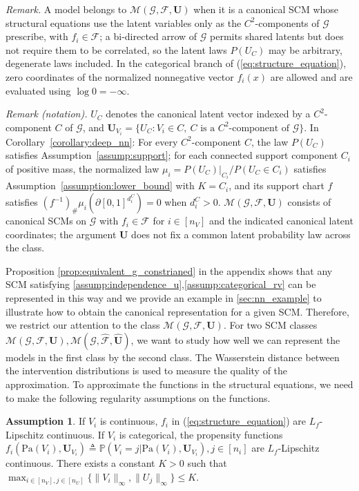 \documentclass[12pt]{article}
\theoremstyle{plain}
\theoremstyle{definition}
\newtheorem{assumption}[theorem]{Assumption}
\theoremstyle{remark}
\begin{document}
\noindent\textit{Remark.} A model belongs to $\mathcal M(\mathcal G,\mathcal F,\boldsymbol U)$ when it is a canonical SCM whose structural equations use the latent variables only as the $C^2$-components of $\mathcal G$ prescribe, with $f_i\in\mathcal F$; a bi-directed arrow of $\mathcal G$ permits shared latents but does not require them to be correlated, so the latent laws $P(U_C)$ may be arbitrary, degenerate laws included. In the categorical branch of (\ref{eq:structure_equation}), zero coordinates of the normalized nonnegative vector $f_i(x)$ are allowed and are evaluated using $\log 0=-\infty$.

\noindent\textit{Remark (notation).} $U_C$ denotes the canonical latent vector indexed by a $C^2$-component $C$ of $\mathcal{G}$, and $\boldsymbol{U}_{V_i}=\{U_C:V_i\in C,\ C\text{ is a }C^2\text{-component of }\mathcal{G}\}$. In Corollary~\ref{corollary:deep_nn}: For every $C^2$-component $C$, the law $P(U_C)$ satisfies Assumption~\ref{assump:support}; for each connected support component $C_i$ of positive mass, the normalized law $\mu_i=P(U_C)|_{C_i}/P(U_C\in C_i)$ satisfies Assumption~\ref{assumption:lower_bound} with $K=C_i$, and its support chart $f$ satisfies $(f^{-1})_{\#}\mu_i(\partial[0,1]^{d_i^C})=0$ when $d_i^C>0$. $\mathcal{M}(\mathcal{G},\mathcal{F},\boldsymbol{U})$ consists of canonical SCMs on $\mathcal{G}$ with $f_i\in\mathcal{F}$ for $i\in[n_V]$ and the indicated canonical latent coordinates; the argument $\boldsymbol{U}$ does not fix a common latent probability law across the class.

Proposition \ref{prop:equivalent_g_constrianed} in the appendix shows that any SCM satisfying \cref{assump:independence_u},\ref{assump:categorical_rv} can be represented in this way and we provide an example in \cref{sec:nn_example} to illustrate how to obtain the canonical representation for a given SCM. Therefore, we restrict our attention to the class $ \mathcal{M}(\mathcal{G} ,\mathcal{F} ,\boldsymbol{U})$. For two SCM classes $ \mathcal{M}(\mathcal{G} ,\mathcal{F} ,\boldsymbol{U}), \mathcal{M}(\mathcal{G} ,\hat{\mathcal{F}} ,\boldsymbol{\hat{U}}) $, we want to study how well we can represent the models in the first class by the second class. The Wasserstein distance between the intervention distributions is used to measure the quality of the approximation. To approximate the functions in the structural equations, we need to make the following regularity assumptions on the functions.
\begin{assumption}\label{assump:Lip_and_bounded}
If $ V_i$ is continuous, $f_i$ in (\ref{eq:structure_equation}) are $L_f$-Lipschitz continuous. If $V_i$ is categorical, the propensity functions $f_i(\text{Pa}(V_i), \boldsymbol{U}_{V_i})\triangleq \mathbb{P}(V_i = j|\text{Pa}( V_{i}) ,\boldsymbol{U}_{V_{i}}),j\in[n_i]$ are $L_f$-Lipschitz continuous. There exists a constant $K>0$ such that  $\max_{i\in [n_V],j\in [n_U]}\{\|V_i\|_\infty,\|U_j\|_\infty\} \leqslant K$.
\end{assumption}
\end{document}
